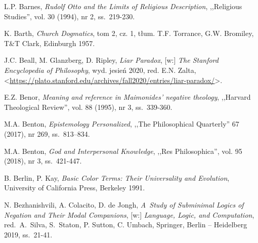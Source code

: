 \begin{thebibliography}{100}
L.P. Barnes, \textit{Rudolf Otto and the Limits of Religious Description}, ,,Religious Studies'', vol. 30 (1994), nr 2, ss.~219-230.


K. Barth, \textit{Church Dogmatics}, tom 2, cz. 1, tłum. T.F. Torrance, G.W. Bromiley, T\&T Clark, Edinburgh 1957.

J.C. Beall, M. Glanzberg, D. Ripley, \textit{Liar Paradox}, [w:] \textit{The Stanford Encyclopedia of Philosophy},
wyd. jesień 2020, red. E.N. Zalta, {\textless}\url{https://plato.stanford.edu/archives/fall2020/entries/liar-paradox/}{\textgreater}.


E.Z. Benor, \textit{Meaning and reference in Maimonides' negative theology}, ,,Harvard Theological Review'', vol. 88 (1995), nr 3, ss.~339-360.

M.A. Benton, \textit{Epistemology Personalized}, ,,The Philosophical Quarterly'' 67 (2017), nr 269, ss.~813–834.

M.A. Benton, \textit{God and Interpersonal Knowledge}, ,,Res Philosophica'', vol. 95 (2018), nr 3, ss.~421-447.


B. Berlin, P. Kay, \textit{Basic Color Terms: Their Universality and Evolution}, University of California Press, Berkeley 1991.

N. Bezhanishvili, A. Colacito, D. de Jongh, \textit{A~Study of Subminimal Logics of Negation and Their Modal Companions},
[w:] \textit{Language, Logic, and Computation}, red.~A.~Silva, S.~Staton, P. Sutton, C. Umbach, Springer, Berlin -- Heidelberg 2019, ss.~21-41.


\end{thebibliography}
